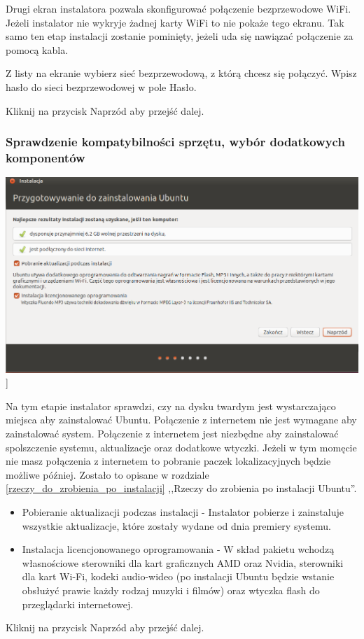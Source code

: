 Drugi ekran instalatora pozwala skonfigurować połączenie bezprzewodowe WiFi. Jeżeli instalator nie wykryje żadnej karty WiFi to nie pokaże tego ekranu. Tak samo ten etap instalacji zostanie pominięty, jeżeli uda się nawiązać połączenie za pomocą kabla.

Z listy na ekranie wybierz sieć bezprzewodową, z którą chcesz się połączyć. Wpisz hasło do sieci bezprzewodowej w pole \textcolor{ubuntu_orange}{Hasło}.
\begin{flushright}
Kliknij na przycisk \textcolor{ubuntu_orange}{Naprzód} aby przejść dalej.
\end{flushright}
\clearpage
\subsubsection{Sprawdzenie kompatybilności sprzętu, wybór dodatkowych komponentów}
\begin{center}
        \includegraphics[width=\linewidth]{images/instalator_wymagania.png}]
\end{center}

Na tym etapie instalator sprawdzi, czy na dysku twardym jest wystarczająco miejsca aby zainstalować Ubuntu. Połączenie z internetem nie jest wymagane aby zainstalować system. Połączenie z internetem jest niezbędne aby zainstalować spolszczenie systemu, aktualizacje oraz dodatkowe wtyczki. Jeżeli w tym momęcie nie masz połączenia z internetem to pobranie paczek lokalizacyjnych będzie możliwe później. Zostało to opisane w rozdziale \ref{rzeczy_do_zrobienia_po_instalacji} ,,Rzeczy do zrobienia po instalacji Ubuntu''.
\begin{itemize}
\item \textcolor{ubuntu_orange}{Pobieranie aktualizacji podczas instalacji} - Instalator pobierze i zainstaluje wszystkie aktualizacje, które zostały wydane od dnia premiery systemu.
\item \textcolor{ubuntu_orange}{Instalacja licencjonowanego oprogramowania} - W skład pakietu wchodzą własnościowe sterowniki dla kart graficznych AMD oraz Nvidia, sterowniki dla kart Wi-Fi, kodeki audio-wideo (po instalacji Ubuntu będzie wstanie obsłużyć prawie każdy rodzaj muzyki i filmów) oraz wtyczka flash do przeglądarki internetowej.
\end{itemize}
\begin{flushright}
Kliknij na przycisk \textcolor{ubuntu_orange}{Naprzód} aby przejść dalej.
\end{flushright}
\clearpage
